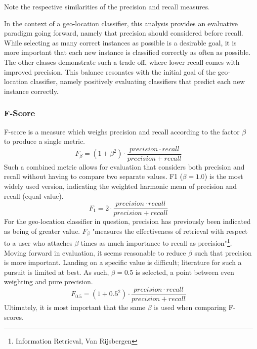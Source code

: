 \documentclass[twocolumn]{article}
\begin{document}
Note the respective similarities of the precision and recall measures.

In the context of a geo-location classifier, this analysis provides an evaluative paradigm going forward, namely that precision should considered before recall. While selecting as many correct instances as possible is a desirable goal, it is more important that each new instance is classified correctly as often as possible. The other classes demonstrate such a trade off, where lower recall comes with improved precision. This balance resonates with the initial goal of the geo-location classifier, namely positively evaluating classifiers that predict each new instance correctly.

\subsubsection{F-Score}
F-score is a measure which weighs precision and recall according to the factor $\beta$ to produce a single metric.
\begin{equation}
F_\beta = (1+\beta ^2) \cdot \frac{precision \cdot recall}{precision + recall}
\end{equation}
Such a combined metric allows for evaluation that considers both precision and recall without having to compare two separate values. F1 ($\beta = 1.0$) is the most widely used version, indicating the weighted harmonic mean of precision and recall (equal value).
\begin{equation}
F_1 = 2 \cdot \frac{precision \cdot recall}{precision + recall}
\end{equation}
For the geo-location classifier in question, precision has previously been indicated as being of greater value. $F_\beta$ "measures the effectiveness of retrieval with respect to a user who attaches $\beta$ times as much importance to recall as precision"\footnote{\cite{vanrijsbergenc.j.1979} Information Retrieval, Van Rijsbergen}. Moving forward in evaluation, it seems reasonable to reduce $\beta$ such that precision is more important. Landing on a specific value is difficult; literature for such a pursuit is limited at best. As such, $\beta = 0.5$ is selected, a point between even weighting and pure precision.
\begin{equation}
F_{0.5} = (1+0.5^2) \cdot \frac{precision \cdot recall}{precision + recall}
\end{equation}
Ultimately, it is most important that the same $\beta$ is used when comparing F-scores.
\end{document}
